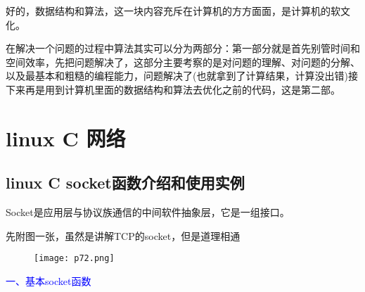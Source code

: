 \documentclass[utf8]{book}
\begin{document}
	好的，数据结构和算法，这一块内容充斥在计算机的方方面面，是计算机的软文化。
	
	在解决一个问题的过程中算法其实可以分为两部分：第一部分就是首先别管时间和空间效率，先把问题解决了，这部分主要考察的是对问题的理解、对问题的分解、以及最基本和粗糙的编程能力，问题解决了(也就拿到了计算结果，计算没出错)接下来再是用到计算机里面的数据结构和算法去优化之前的代码，这是第二部。


	\chapter{linux C 网络}	
	\section{linux C socket函数介绍和使用实例}	
	
	Socket是应用层与协议族通信的中间软件抽象层，它是一组接口。

	先附图一张，虽然是讲解TCP的socket，但是道理相通
	
	\begin{figure}[H]
	\centering
	\texttt{[image: p72.png]}
	\end{figure}	

	\large \textcolor{blue}{一、基本socket函数}
	
\end{document}
